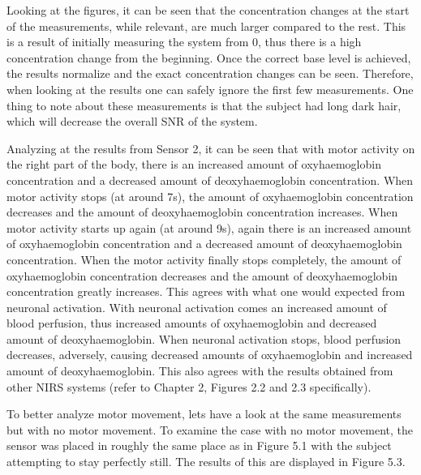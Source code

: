 Looking at the figures, it can be seen that the concentration changes at the start of the measurements, while relevant, are much larger compared to the rest. This is a result of initially measuring the system from 0, thus there is a high concentration change from the beginning. Once the correct base level is achieved, the results normalize and the exact concentration changes can be seen. Therefore, when looking at the results one can safely ignore the first few measurements. One thing to note about these measurements is that the subject had long dark hair, which will decrease the overall SNR of the system.

Analyzing at the results from Sensor 2, it can be seen that with motor activity on the right part of the body, there is an increased amount of oxyhaemoglobin concentration and a decreased amount of deoxyhaemoglobin concentration. When motor activity stops (at around 7s), the amount of oxyhaemoglobin concentration decreases and the amount of deoxyhaemoglobin concentration increases. When motor activity starts up again (at around 9s), again there is an increased amount of oxyhaemoglobin concentration and a decreased amount of deoxyhaemoglobin concentration. When the motor activity finally stops completely, the amount of oxyhaemoglobin concentration decreases and the amount of deoxyhaemoglobin concentration greatly increases. This agrees with what one would expected from neuronal activation. With neuronal activation comes an increased amount of blood perfusion, thus increased amounts of oxyhaemoglobin and decreased amount of deoxyhaemoglobin. When neuronal activation stops, blood perfusion decreases, adversely, causing decreased amounts of oxyhaemoglobin and increased amount of deoxyhaemoglobin. This also agrees with the results obtained from other NIRS systems (refer to Chapter 2, Figures 2.2 and 2.3 specifically).

To better analyze motor movement, lets have a look at the same measurements but with no motor movement. To examine the case with no motor movement, the sensor was placed in roughly the same place as in Figure 5.1 with the subject attempting to stay perfectly still. The results of this are displayed in Figure 5.3.

